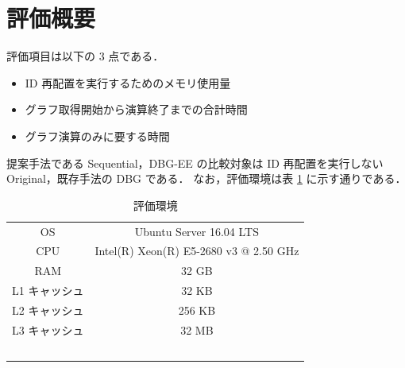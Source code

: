 \section{評価概要}
評価項目は以下の 3 点である．
\begin{itemize}
  \item ID 再配置を実行するためのメモリ使用量
  \item グラフ取得開始から演算終了までの合計時間 
  \item グラフ演算のみに要する時間
\end{itemize}
提案手法である Sequential，DBG-EE の比較対象は ID 再配置を実行しない Original，既存手法の DBG である．
なお，評価環境は表 \ref{eval_env} に示す通りである．
\begin{table}[t]
  \begin{center}
    \caption{評価環境}
    \begin{tabular}{cc} \toprule
      OS & Ubuntu Server 16.04 LTS \\
      CPU & Intel(R) Xeon(R) E5-2680 v3 @ 2.50 GHz \\
      RAM & 32 GB \\
      L1 キャッシュ & 32 KB  \\
      L2 キャッシュ & 256 KB \\
      L3 キャッシュ & 32 MB \\ \bottomrule 
    \end{tabular}
    \label{eval_env}
  \end{center}
\end{table}

